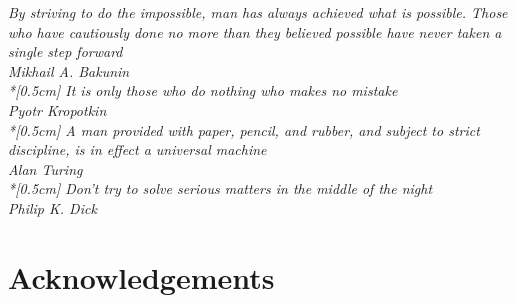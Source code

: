 
\thispagestyle{empty}

\begin{flushright}{\slshape
	\textit{By striving to do the impossible, man has always achieved what is possible. Those who have cautiously done no more than they believed possible have never taken a single step forward} \\
	Mikhail A. Bakunin\\*[0.5cm]
	\textit{It is only those who do nothing who makes no mistake} \\
	Pyotr Kropotkin\\*[0.5cm]
	\textit{A man provided with paper, pencil, and rubber, and subject to strict discipline, is in effect a universal machine} \\
	Alan Turing\\*[0.5cm]
	\textit{Don't try to solve serious matters in the middle of the night} \\
	Philip K. Dick\\	
	}
\end{flushright}



\newpage

\begingroup
\let\clearpage\relax
\let\cleardoublepage\relax
\let\cleardoublepage\relax

\chapter{Acknowledgements}


